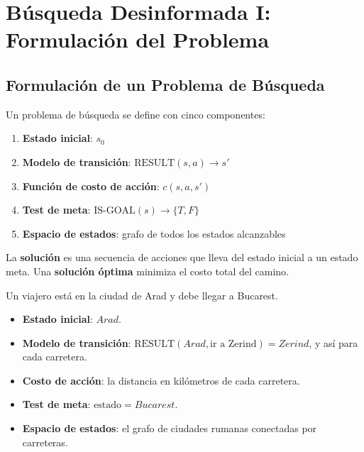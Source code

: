 \section{Búsqueda Desinformada I: Formulación del Problema}

\subsection{Formulación de un Problema de Búsqueda}

\begin{definition}
Un problema de búsqueda se define con cinco componentes:
\begin{enumerate}
    \item \textbf{Estado inicial}: $s_0$
    \item \textbf{Modelo de transición}: $\text{RESULT}(s, a) \rightarrow s'$
    \item \textbf{Función de costo de acción}: $c(s, a, s')$
    \item \textbf{Test de meta}: $\text{IS-GOAL}(s) \rightarrow \{T, F\}$
    \item \textbf{Espacio de estados}: grafo de todos los estados alcanzables
\end{enumerate}
\end{definition}

La \textbf{solución} es una secuencia de acciones que lleva del estado inicial a un estado meta. Una \textbf{solución óptima} minimiza el costo total del camino.

\begin{example}
    Un viajero está en la ciudad de Arad y debe llegar a Bucarest.
    \begin{itemize}
        \item \textbf{Estado inicial}: $Arad$.
        \item \textbf{Modelo de transición}: $\text{RESULT}(Arad, \text{ir a Zerind}) = Zerind$, y así para cada carretera.
        \item \textbf{Costo de acción}: la distancia en kilómetros de cada carretera.
        \item \textbf{Test de meta}: $\text{estado} = Bucarest$.
        \item \textbf{Espacio de estados}: el grafo de ciudades rumanas conectadas por carreteras.
    \end{itemize}
\end{example}

